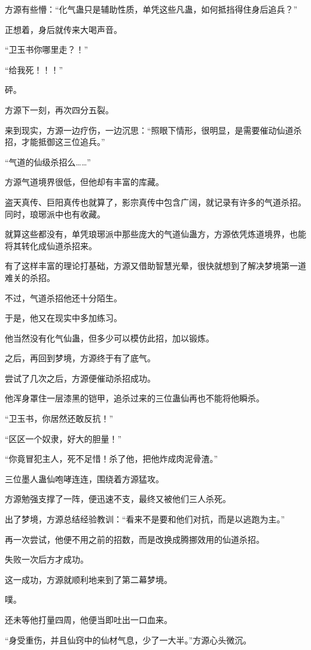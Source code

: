 \begin{this_body}
方源有些懵：“化气蛊只是辅助性质，单凭这些凡蛊，如何抵挡得住身后追兵？”

正想着，身后就传来大喝声音。

“卫玉书你哪里走？！”

“给我死！！！”

砰。

方源下一刻，再次四分五裂。

来到现实，方源一边疗伤，一边沉思：“照眼下情形，很明显，是需要催动仙道杀招，才能抵御这三位追兵。”

“气道的仙级杀招么……”

方源气道境界很低，但他却有丰富的库藏。

盗天真传、巨阳真传也就算了，影宗真传中包含广阔，就记录有许多的气道杀招。同时，琅琊派中也有收藏。

就算这些都没有，单凭琅琊派中那些庞大的气道仙蛊方，方源依凭炼道境界，也能将其转化成仙道杀招来。

有了这样丰富的理论打基础，方源又借助智慧光晕，很快就想到了解决梦境第一道难关的杀招。

不过，气道杀招他还十分陌生。

于是，他又在现实中多加练习。

他当然没有化气仙蛊，但多少可以模仿此招，加以锻炼。

之后，再回到梦境，方源终于有了底气。

尝试了几次之后，方源便催动杀招成功。

他浑身罩住一层漆黑的铠甲，追杀过来的三位蛊仙再也不能将他瞬杀。

“卫玉书，你居然还敢反抗！”

“区区一个奴隶，好大的胆量！”

“你竟冒犯主人，死不足惜！杀了他，把他炸成肉泥骨渣。”

三位墨人蛊仙咆哮连连，围绕着方源猛攻。

方源勉强支撑了一阵，便迅速不支，最终又被他们三人杀死。

出了梦境，方源总结经验教训：“看来不是要和他们对抗，而是以逃跑为主。”

再一次尝试，他便不用之前的招数，而是改换成腾挪效用的仙道杀招。

失败一次后方才成功。

这一成功，方源就顺利地来到了第二幕梦境。

噗。

还未等他打量四周，他便当即吐出一口血来。

“身受重伤，并且仙窍中的仙材气息，少了一大半。”方源心头微沉。


\end{this_body}
